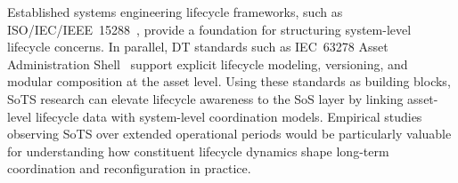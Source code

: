 Established systems engineering lifecycle frameworks, such as ISO/IEC/IEEE~15288~\cite{7106435}, provide a foundation for structuring system-level lifecycle concerns. In parallel, DT standards such as IEC~63278 Asset Administration Shell~\cite{aas_details_2018_p1} support explicit lifecycle modeling, versioning, and modular composition at the asset level. Using these standards as building blocks, SoTS research can elevate lifecycle awareness to the SoS layer by linking asset-level lifecycle data with system-level coordination models. Empirical studies observing SoTS over extended operational periods would be particularly valuable for understanding how constituent lifecycle dynamics shape long-term coordination and reconfiguration in practice.


\addblockend{}
